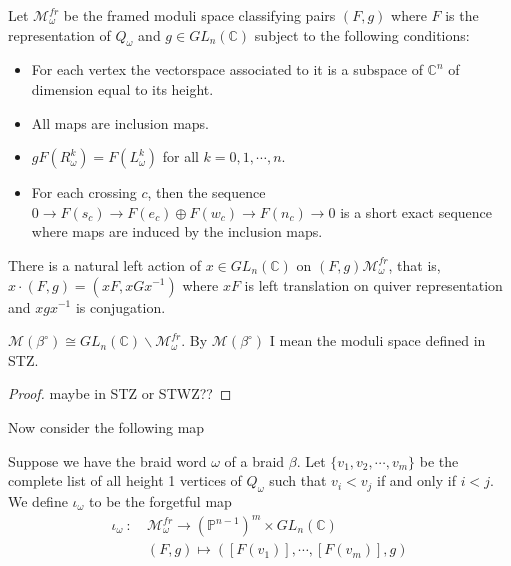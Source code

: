 \begin{definition}
	Let $\mathcal{M}^{fr}_{\omega}$ be the framed moduli space classifying pairs $(F,g)$ where $F$ is the representation of $Q_{\omega}$ and $g\in GL_n(\mathbb{C})$ subject to the following conditions:
	\begin{itemize}
		\item For each vertex the vectorspace associated to it is a subspace of $\mathbb{C}^n$ of dimension equal to its height.
		\item  All maps are inclusion maps.
		\item  $gF(R^k_{\omega})=F(L^k_{\omega})$ for all $k=0,1,\cdots, n$.
		\item For each crossing $c$, then the sequence $0\rightarrow F(s_c)\rightarrow F(e_c)\oplus F(w_c)\rightarrow F(n_c)\rightarrow 0$ is a short exact sequence where maps are induced by the inclusion maps.
	\end{itemize}
\end{definition}

\begin{remark}
	There is a natural left action of $x\in GL_n(\mathbb{C})$ on $(F,g)\mathcal{M}^{fr}_{\omega}$, that is, $x\cdot(F,g)=(xF,xGx^{-1})$ where $xF$ is left translation on quiver representation and $xgx^{-1}$ is conjugation.
\end{remark}

\begin{theorem}
	$\mathcal{M}(\beta^{\circ})\cong GL_n(\mathbb{C})\backslash \mathcal{M}^{fr}_{\omega}$. By $\mathcal{M}(\beta^{\circ})$ I mean the moduli space defined in STZ.
\end{theorem}
\begin{proof} 
maybe in STZ or STWZ??
\end{proof}

Now consider the following map
\begin{definition}
Suppose we have the braid word $\omega$ of a braid $\beta$. Let $\{v_1,v_2,\cdots,v_m\}$ be the complete list of all height 1 vertices of $Q_{\omega}$ such that $v_i<v_j$ if and only if $i<j$. We define $\iota_\omega$ to be the  forgetful map 
\begin{align*}
\iota_{\omega}~:~ &\mathcal{M}^{fr}_{\omega}\rightarrow(\mathbb{P}^{n-1})^m\times GL_n(\mathbb{C})\\
& (F,g) \mapsto ([F(v_1)],\cdots,[F(v_m)], g)
\end{align*}
\end{definition}

